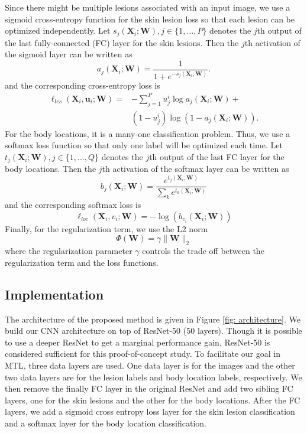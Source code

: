 \documentclass[letterpaper]{article}
\begin{document}
Since there might be multiple lesions associated with an input image, we use
a sigmoid cross-entropy function for the skin lesion loss so that each lesion
can be optimized independently. Let $s_j(\mathbf{X}_i; \mathbf{W}), j \in \{1, \dots, P\}$
denotes the $j$th output of the last fully-connected (FC) layer for the skin lesions.
Then the $j$th activation of the sigmoid layer can be written as
\begin{equation}
a_j(\mathbf{X}_i; \mathbf{W}) = \frac{1}{1 + e^{-s_j(\mathbf{X}_i; \mathbf{W})}}.
\end{equation}
and the corresponding cross-entropy loss is
\begin{align}
\ell_{les}(\mathbf{X}_i, \mathbf{u}_i; \mathbf{W}) = & - \sum_{j=1}^Pu_j^i\log{a_j(\mathbf{X}_i; \mathbf{W})} + \nonumber \\
& (1-u_j^i)\log{(1 - a_j(\mathbf{X}_i; \mathbf{W}))}.
\end{align}
For the body locations, it is a many-one classification problem. Thus, we use
a softmax loss function so that only one label will be optimized each time.
Let $t_j(\mathbf{X}_i; \mathbf{W}), j \in \{1, \dots, Q\}$ denotes the $j$th output
of the last FC layer for the body locations.
Then the $j$th activation of the softmax layer can be written as
\begin{equation}
b_j(\mathbf{X}_i; \mathbf{W}) = \frac{e^{t_j(\mathbf{X}_i; \mathbf{W})}}{\sum_ke^{t_k(\mathbf{X}_i; \mathbf{W})}}
\end{equation}
and the corresponding softmax loss is
\begin{equation}
\ell_{loc}(\mathbf{X}_i, v_i; \mathbf{W}) = -\log(b_{v_i}(\mathbf{X}_i; \mathbf{W}))
\end{equation}
Finally, for the regularization term, we use the L2 norm
\begin{equation}
\Phi(\mathbf{W}) = \gamma\|\mathbf{W}\|_2
\end{equation}
where the regularization
parameter $\gamma$ controls the trade off between the regularization term and
the loss functions.

\subsection{Implementation}

The architecture of the proposed method is given in Figure \ref{fig: architecture}.
We build our CNN architecture on top of ResNet-50 (50 layers). Though it is
possible to use a deeper ResNet to get a marginal performance gain, ResNet-50 is
considered sufficient for this proof-of-concept study. To facilitate our goal in MTL,
three data layers are used. One data layer is for the images and the other two data layers
are for the lesion labels and body location labels, respectively. We then remove
the finally FC layer in the original ResNet and add two sibling FC layers, one
for the skin lesions and the other for the body locations. After the FC layers,
we add a sigmoid cross entropy loss layer for the skin lesion classification and
a softmax layer for the body location classification.
\end{document}
